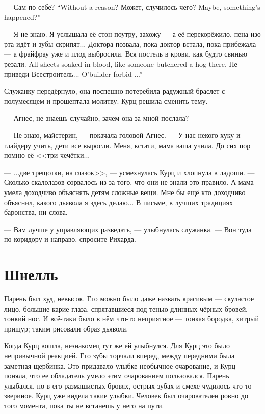 {--- Сам по себе?}
{``Without a reason?}
{Может, случилось чего?}
{Maybe, something's happened?''}

--- Я не знаю.
Я услышала её стон поутру, захожу --- а её перекорёжило, пена изо рта идёт и зубы скрипят...
Доктора позвала, пока доктор встала, пока прибежала --- а фрайфрау уже и плод выбросила.
{Вся постель в крови, как будто свинью резали.}
{All sheets soaked in blood, like someone butchered a hog there.}
{Не приведи Всестроитель...}
{O'builder forbid ...''}

Служанку передёрнуло, она поспешно потеребила радужный браслет с полумесяцем и прошептала молитву.
Курц решила сменить тему.

--- Агнес, не знаешь случайно, зачем она за мной послала?

--- Не знаю, майстерин, --- покачала головой Агнес.
--- У нас некого хуку и глайдеру учить, дети все выросли.
Меня, кстати, мама ваша учила.
До сих пор помню её <<три чечётки...

--- ...две трещотки, на глазок>>, --- усмехнулась Курц и хлопнула в ладоши.
--- Сколько скалолазов сорвалось из-за того, что они не знали это правило.
А мама умела доходчиво объяснять детям сложные вещи.
Мне бы ещё кто доходчиво объяснил, какого дьявола я здесь делаю...
В письме, в лучших традициях баронства, ни слова.

--- Вам лучше у управляющих разведать, --- улыбнулась служанка.
--- Вон туда по коридору и направо, спросите Рихарда.

\section{Шнелль}

Парень был худ, невысок.
Его можно было даже назвать красивым --- скуластое лицо, большие карие глаза, спрятавшиеся под тенью длинных чёрных бровей, тонкий нос.
И всё-таки было в нём что-то неприятное --- тонкая бородка, хитрый прищур;
таким рисовали образ дьявола.

Когда Курц вошла, незнакомец тут же ей улыбнулся.
Для Курц это было непривычной реакцией.
Его зубы торчали вперед, между передними была заметная щербинка.
Это придавало улыбке необычное очарование, и Курц поняла, что ее обладатель умело этим очарованием пользовался.
Парень улыбался, но в его размашистых бровях, острых зубах и смехе чудилось что-то звериное.
Курц уже видела такие улыбки.
Человек был очарователен ровно до того момента, пока ты не встанешь у него на пути.

